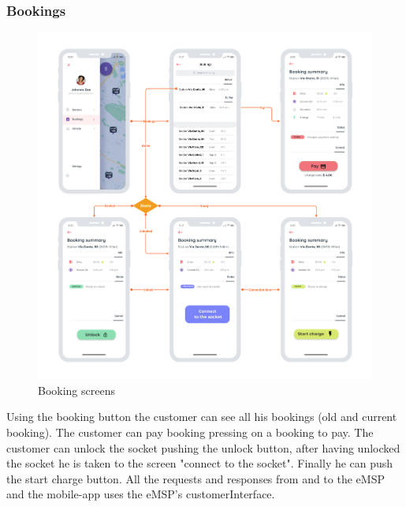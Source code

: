 \subsubsection{Bookings}
\begin{center}
    \begin{figure}[H]
        \includegraphics[width=\textwidth]{./img/design/app/Bookings.png}
        \caption{Booking screens}
    \end{figure}
\end{center}
Using the booking button the customer can see all his bookings (old and current booking). The customer can pay booking pressing on a booking to pay. The customer can unlock the socket pushing the unlock button, after having unlocked the socket he is taken to the screen "connect to the socket". Finally he can push the start charge button. All the requests and responses from and to the eMSP and the mobile-app uses the eMSP's customerInterface.

